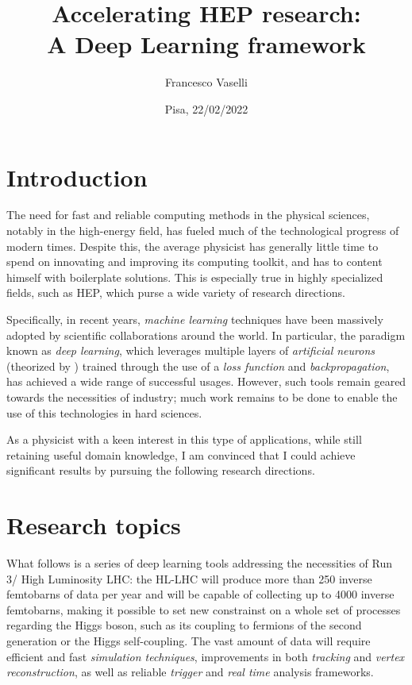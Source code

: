 \documentclass{scrartcl} %
\title{Accelerating HEP research: \\A Deep Learning framework}
\author{Francesco Vaselli}
\date{Pisa, 22/02/2022}
\begin{document}
	\maketitle
	
	
	\section*{Introduction}
	The need for fast and reliable computing methods in the physical sciences, notably in the high-energy field, has fueled much of the technological progress of modern times. Despite this, the average physicist has generally little time to spend on innovating and improving its computing toolkit, and has to content himself with boilerplate solutions. This is especially true in highly specialized fields, such as HEP, which purse a wide variety of research directions.
	
	Specifically, in recent years, \emph{machine learning} techniques have been massively adopted by scientific collaborations around the world. In particular, the paradigm known as \emph{deep learning}, which leverages multiple layers of \emph{artificial neurons} (theorized by \cite{Rosenblatt1958ThePA}) trained through the use of a \emph{loss function} and \emph{backpropagation}, has achieved a wide range of successful usages. However, such tools remain geared towards the necessities of industry; much work remains to be done to enable the use of this technologies in hard sciences.
	
	As a physicist with a keen interest in this type of applications, while still retaining useful domain knowledge, I am convinced that I could achieve significant results by pursuing the following research directions. 

	
	\section*{Research topics}
	
	What follows is a series of deep learning tools addressing the necessities of Run 3/ High Luminosity LHC: the HL-LHC will produce more than 250 inverse femtobarns of data per year and will be capable of collecting up to 4000 inverse femtobarns, making it possible to set new constrainst on a whole set of processes regarding the Higgs boson, such as its coupling to fermions of the second generation or the Higgs self-coupling. The vast amount of data will require efficient and fast \emph{simulation techniques}, improvements in both \emph{tracking} and \emph{vertex reconstruction}, as well as reliable \emph{trigger} and \emph{real time} analysis frameworks.
	
\end{document}
